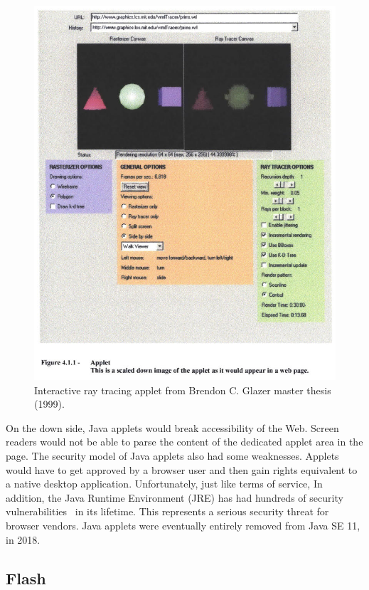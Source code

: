 \begin{figure}[h!]
	\centering
	\includegraphics[width=\linewidth]{assets/img/glazer-thesis.jpg}
	\caption{Interactive ray tracing applet from Brendon C. Glazer master thesis (1999).}%
	\label{fig:glazer-thesis}
\end{figure}

On the down side, Java applets would break accessibility of the Web.
Screen readers would not be able to parse the content of the dedicated
applet area in the page.
The security model of Java applets also had some weaknesses.
Applets would have to get approved by a browser user and then gain rights
equivalent to a native desktop application.
Unfortunately, just like terms of service,
In addition, the Java Runtime Environment (JRE) has had hundreds of security
vulnerabilities~\cite{JreCve} in its lifetime.
This represents a serious security threat for browser vendors.
Java applets were eventually entirely removed from Java SE 11, in 2018.

\subsection{Flash}%
\label{sub:Flash}

